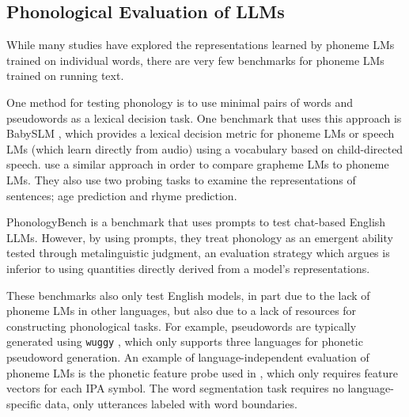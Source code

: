 
\subsection{Phonological Evaluation of LLMs}


While many studies have explored the representations learned by phoneme LMs trained on individual words, there are very few benchmarks for phoneme LMs trained on running text.

One method for testing phonology is to use minimal pairs of words and pseudowords as a lexical decision task. One benchmark that uses this approach is BabySLM \citep{lavechin}, which provides a lexical decision metric for phoneme LMs or speech LMs (which learn directly from audio) using a vocabulary based on child-directed speech. \citet{bunzeck-etal-2025-small} use a similar approach in order to compare grapheme LMs to phoneme LMs. They also use two probing tasks to examine the representations of sentences; age prediction and rhyme prediction. %

PhonologyBench \citep{suvarna-etal-2024-phonologybench} is a benchmark that uses prompts to test chat-based English LLMs. However, by using prompts, they treat phonology as an emergent ability tested through metalinguistic judgment, an evaluation strategy which \citet{hu2023prompting} argues is inferior to using quantities directly derived from a model's representations.  

These benchmarks also only test English models, in part due to the lack of phoneme LMs in other languages, but also due to a lack of resources for constructing phonological tasks. For example, pseudowords are typically generated using \texttt{wuggy} \citep{keuleers2010wuggy}, which only supports three languages for phonetic pseudoword generation. An example of language-independent evaluation of phoneme LMs is the phonetic feature probe used in \citet{goriely2025}, which only requires feature vectors for each IPA symbol. The word segmentation task requires no language-specific data, only utterances labeled with word boundaries. 

